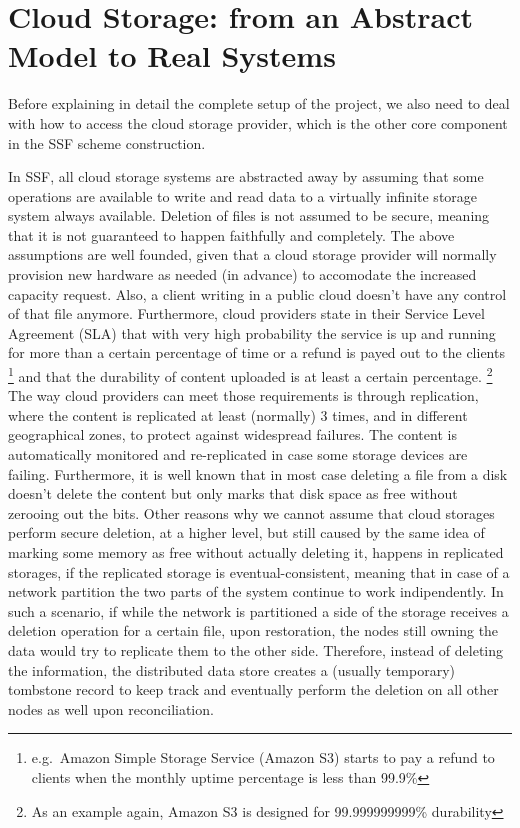 \section{Cloud Storage: from an Abstract Model to Real Systems}\label{sc:cloud-storage}

Before explaining in detail the complete setup of the project,
we also need to deal with how to access the cloud storage provider,
which is the other core component in the SSF scheme construction.

In SSF, all cloud storage systems are abstracted away by assuming
that some operations are available to write and read data to a virtually
infinite storage system always available.
Deletion of files is not assumed to be secure, meaning that it is not guaranteed to happen faithfully and completely.
The above assumptions are well founded, given that a cloud storage provider
will normally provision new hardware as needed (in advance) to accomodate the
increased capacity request.
Also, a client writing in a public cloud doesn't have any control of that file anymore.
Furthermore, cloud providers state in their Service Level Agreement (SLA) that
with very high probability the service is up and running for more than a certain percentage of time or a refund is payed out to the clients
\footnote{e.g.\ Amazon Simple Storage Service (Amazon S3) starts to pay a refund to clients when the monthly uptime percentage is less than 99.9\%}
and that the durability of content uploaded is at least a certain percentage.
\footnote{As an example again, Amazon S3 is designed for 99.999999999\% durability}
The way cloud providers can meet those requirements is through replication, where the content is replicated at least (normally) 3 times, and in different geographical zones, to protect against widespread failures.
The content is automatically monitored and re-replicated in case some storage devices are failing. 
Furthermore, it is well known that in most case deleting a file from a disk doesn't delete the content but only marks that disk space as free without zerooing out the bits. 
Other reasons why we cannot assume that cloud storages perform secure deletion, at a higher level, but still caused by the same idea of marking some memory as free without actually deleting it,
happens in replicated storages, if the replicated storage is eventual-consistent, meaning that in case of a network partition the two parts of the system continue to work indipendently.
In such a scenario, if while the network is partitioned a side of the storage receives a deletion operation for a certain file, upon restoration,
the nodes still owning the data would try to replicate them to the other side.
Therefore, instead of deleting the information, the distributed data store creates a (usually temporary) tombstone record to keep track and eventually perform the deletion on all other nodes as well upon reconciliation.


